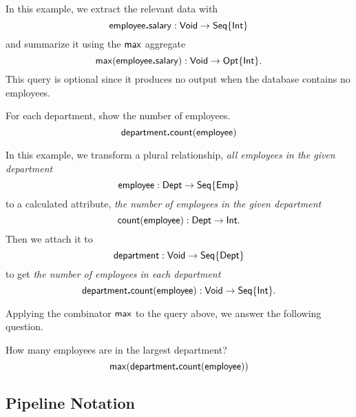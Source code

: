 In this example, we extract the relevant data with
\begin{equation*}
    \mathsf{employee}\boldsymbol{.}\mathsf{salary} : \mathsf{Void} \to \mathsf{Seq}{\left\{\mathsf{Int}\right\}}
\end{equation*}
and summarize it using the $\mathsf{max}$ aggregate
\begin{equation*}
    \mathsf{max}(\mathsf{employee}\boldsymbol{.}\mathsf{salary}) : \mathsf{Void} \to \mathsf{Opt}{\left\{\mathsf{Int}\right\}}.
\end{equation*}
This query is optional since it produces no output when the database contains
no employees.

\begin{demo}
    \label{ex:department-count-employee}
    For each department, show the number of employees.
    \begin{equation*}
        \mathsf{department}\boldsymbol{.}\mathsf{count}(\mathsf{employee})
    \end{equation*}
\end{demo}

In this example, we transform a plural relationship, \emph{all employees in the
given department}
\begin{equation*}
    \mathsf{employee} : \mathsf{Dept} \to \mathsf{Seq}{\left\{\mathsf{Emp}\right\}}
\end{equation*}
to a calculated attribute, \emph{the number of employees in the given
department}
\begin{equation*}
    \mathsf{count}(\mathsf{employee}) : \mathsf{Dept} \to \mathsf{Int}.
\end{equation*}
Then we attach it to
\begin{equation*}
    \mathsf{department} : \mathsf{Void} \to \mathsf{Seq}{\left\{\mathsf{Dept}\right\}}
\end{equation*}
to get \emph{the number of employees in each department}
\begin{equation*}
    \mathsf{department}\boldsymbol{.}\mathsf{count}(\mathsf{employee}) : \mathsf{Void} \to \mathsf{Seq}{\left\{\mathsf{Int}\right\}}.
\end{equation*}

Applying the combinator $\mathsf{max}$ to the query above, we answer the following
question.

\begin{demo}
    \label{ex:max-department-count-employee}
    How many employees are in the largest department?
    \begin{equation*}
        \mathsf{max}(\mathsf{department}\boldsymbol{.}\mathsf{count}(\mathsf{employee}))
    \end{equation*}
\end{demo}

\subsection*{Pipeline Notation}

